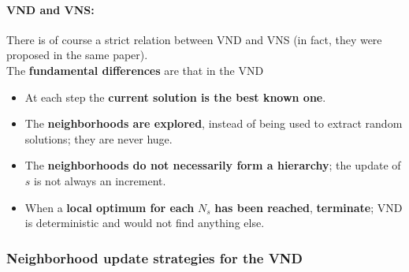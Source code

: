 \documentclass[11pt]{article}
\begin{document}
	\nn
	
	\paragraph{VND and VNS:} There is of course a strict relation between VND and VNS (in fact, they were proposed in the same paper).\\
	
	The \textbf{fundamental differences} are that in the VND
	\begin{itemize}
		\item At each step the \textbf{current solution is the best known one}.\\
		
		\item The \textbf{neighborhoods are explored}, instead of being used to extract random solutions; they are never huge.\\
		
		\item The \textbf{neighborhoods do not necessarily form a hierarchy}; the update of $s$ is not always an increment.\\
		
		\item When a \textbf{local optimum for each} $N_s$ \textbf{has been reached}, \textbf{terminate}; VND is deterministic and would not find anything else.\\
	\end{itemize}
	
	\newpage
	
	\subsubsection{Neighborhood update strategies for the VND}
	
\end{document}
